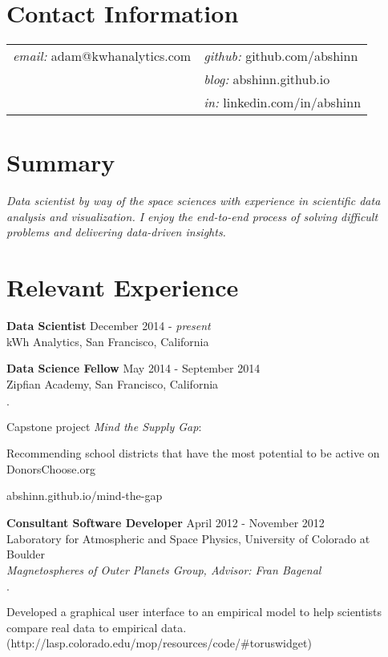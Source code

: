 \documentclass[margin,line]{res}
\newenvironment{list2}{
  \begin{list}{$\cdot$}{%
      \setlength{\itemsep}{0in}
      \setlength{\parsep}{0in} \setlength{\parskip}{0in}
      \setlength{\topsep}{0in} \setlength{\partopsep}{0in} 
      \setlength{\leftmargin}{0.2in}}}{\end{list}}
\begin{document}

\begin{resume}


\section{\sc Contact Information}

\vspace{.1 in}
\begin{tabular}{@{}p{3in}p{4in}}
{\it email:} adam@kwhanalytics.com & {\it github:} github.com/abshinn\\
& {\it blog:} abshinn.github.io\\
& {\it in:} linkedin.com/in/abshinn\\
\end{tabular}


\section{\sc Summary}

{\it Data scientist by way of the space sciences with experience in scientific data analysis and visualization. I enjoy the end-to-end process of solving difficult problems and delivering data-driven insights.}


\section{\sc Relevant Experience}

{\bf Data Scientist} \hfill {December 2014 - {\em present}}\\
kWh Analytics, San Francisco, California

{\bf Data Science Fellow} \hfill {May 2014 - September 2014}\\
Zipfian Academy, San Francisco, California
\begin{list2}
\item Capstone project {\em Mind the Supply Gap}:
\item[] Recommending school districts that have the most potential to be active on DonorsChoose.org
\item[] abshinn.github.io/mind-the-gap
\end{list2}

{\bf Consultant Software Developer} \hfill {April 2012 - November 2012}\\
Laboratory for Atmospheric and Space Physics, University of Colorado at Boulder\\
{\em Magnetospheres of Outer Planets Group, Advisor: Fran Bagenal}
\begin{list2}
\item Developed a graphical user interface to an empirical model to help scientists compare real data to empirical data. (http://lasp.colorado.edu/mop/resources/code/\#toruswidget)
\end{list2}


\end{resume}
\end{document}

